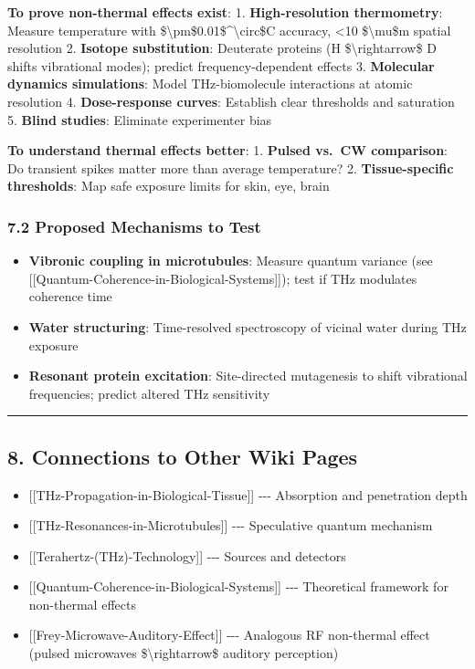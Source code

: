 \textbf{To prove non-thermal effects exist}: 1. \textbf{High-resolution
thermometry}: Measure temperature with
\$\textbackslash pm\$0.01\$\^{}\textbackslash circ\$C accuracy,
\textless10 \$\textbackslash mu\$m spatial resolution 2. \textbf{Isotope
substitution}: Deuterate proteins (H \$\textbackslash rightarrow\$ D
shifts vibrational modes); predict frequency-dependent effects 3.
\textbf{Molecular dynamics simulations}: Model THz-biomolecule
interactions at atomic resolution 4. \textbf{Dose-response curves}:
Establish clear thresholds and saturation 5. \textbf{Blind studies}:
Eliminate experimenter bias

\textbf{To understand thermal effects better}: 1. \textbf{Pulsed vs.~CW
comparison}: Do transient spikes matter more than average temperature?
2. \textbf{Tissue-specific thresholds}: Map safe exposure limits for
skin, eye, brain

\subsubsection{7.2 Proposed Mechanisms to
Test}\label{proposed-mechanisms-to-test}

\begin{itemize}
\tightlist
\item
  \textbf{Vibronic coupling in microtubules}: Measure quantum variance
  (see {[}{[}Quantum-Coherence-in-Biological-Systems{]}{]}); test if THz
  modulates coherence time
\item
  \textbf{Water structuring}: Time-resolved spectroscopy of vicinal
  water during THz exposure
\item
  \textbf{Resonant protein excitation}: Site-directed mutagenesis to
  shift vibrational frequencies; predict altered THz sensitivity
\end{itemize}

\begin{center}\rule{0.5\linewidth}{0.5pt}\end{center}

\subsection{8. Connections to Other Wiki
Pages}\label{connections-to-other-wiki-pages}

\begin{itemize}
\tightlist
\item
  {[}{[}THz-Propagation-in-Biological-Tissue{]}{]} -\/-\/- Absorption
  and penetration depth
\item
  {[}{[}THz-Resonances-in-Microtubules{]}{]} -\/-\/- Speculative quantum
  mechanism
\item
  {[}{[}Terahertz-(THz)-Technology{]}{]} -\/-\/- Sources and detectors
\item
  {[}{[}Quantum-Coherence-in-Biological-Systems{]}{]} -\/-\/-
  Theoretical framework for non-thermal effects
\item
  {[}{[}Frey-Microwave-Auditory-Effect{]}{]} -\/-\/- Analogous RF
  non-thermal effect (pulsed microwaves \$\textbackslash rightarrow\$
  auditory perception)
\end{itemize}


